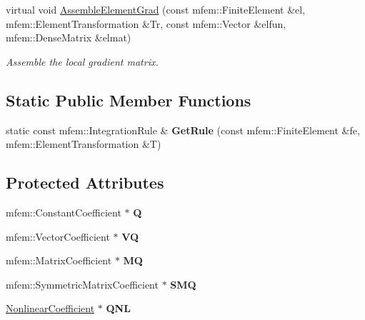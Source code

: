 \begin{DoxyCompactItemize}
\mbox{\label{classDiffusionNLFIntegrator_ac7b70b5cee3c880d52b03a87706ae8e3}} 
virtual void \hyperlink{classDiffusionNLFIntegrator_ac7b70b5cee3c880d52b03a87706ae8e3}{Assemble\+Element\+Grad} (const mfem\+::\+Finite\+Element \&el, mfem\+::\+Element\+Transformation \&Tr, const mfem\+::\+Vector \&elfun, mfem\+::\+Dense\+Matrix \&elmat)
\begin{DoxyCompactList}\small\item\em Assemble the local gradient matrix. \end{DoxyCompactList}\end{DoxyCompactItemize}
\subsection*{Static Public Member Functions}
\begin{DoxyCompactItemize}
\item 
\mbox{\label{classDiffusionNLFIntegrator_a5edf482fa4fc51004636c7f21624c189}} 
static const mfem\+::\+Integration\+Rule \& {\bfseries Get\+Rule} (const mfem\+::\+Finite\+Element \&fe, mfem\+::\+Element\+Transformation \&T)
\end{DoxyCompactItemize}
\subsection*{Protected Attributes}
\begin{DoxyCompactItemize}
\item 
\mbox{\label{classDiffusionNLFIntegrator_a6c7536d247373af0bda2079c2440fe7f}} 
mfem\+::\+Constant\+Coefficient $\ast$ {\bfseries Q}
\item 
\mbox{\label{classDiffusionNLFIntegrator_af061475fcd1cd075e25272501e47477e}} 
mfem\+::\+Vector\+Coefficient $\ast$ {\bfseries VQ}
\item 
\mbox{\label{classDiffusionNLFIntegrator_a50df2e3961e28929d51ea565f954a6d5}} 
mfem\+::\+Matrix\+Coefficient $\ast$ {\bfseries MQ}
\item 
\mbox{\label{classDiffusionNLFIntegrator_a37a89ee4999577e96733d3f1a5522896}} 
mfem\+::\+Symmetric\+Matrix\+Coefficient $\ast$ {\bfseries S\+MQ}
\item 
\mbox{\label{classDiffusionNLFIntegrator_a69764c9ab0bc5424a1a4730a034d28cb}} 
\hyperlink{classNonlinearCoefficient}{Nonlinear\+Coefficient} $\ast$ {\bfseries Q\+NL}
\end{DoxyCompactItemize}


